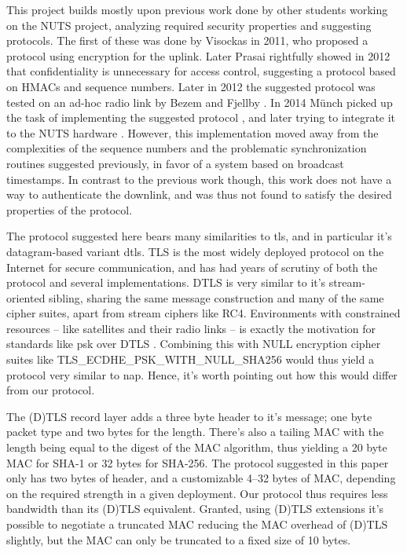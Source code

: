 This project builds mostly upon previous work done by other students working on the NUTS project, analyzing required security properties and suggesting protocols. The first of these was done by Visockas \cite{visockas} in 2011, who proposed a protocol using encryption for the uplink. Later Prasai \cite{prasai} rightfully showed in 2012 that confidentiality is unnecessary for access control, suggesting a protocol based on HMACs and sequence numbers. Later in 2012 the suggested protocol was tested on an ad-hoc radio link by Bezem and Fjellby \cite{bezem-fjellby}. In 2014 Münch picked up the task of implementing the suggested protocol \cite{marius-project}, and later trying to integrate it to the NUTS hardware \cite{marius}. However, this implementation moved away from the complexities of the sequence numbers and the problematic synchronization routines suggested previously, in favor of a system based on broadcast timestamps. In contrast to the previous work though, this work does not have a way to authenticate the downlink, and was thus not found to satisfy the desired properties of the protocol.

The protocol suggested here bears many similarities to \gls{tls}, and in particular it's datagram-based variant \gls{dtls}. TLS is the most widely deployed protocol on the Internet for secure communication, and has had years of scrutiny of both the protocol and several implementations. DTLS is very similar to it's stream-oriented sibling, sharing the same message construction and many of the same cipher suites, apart from stream ciphers like RC4. Environments with constrained resources -- like satellites and their radio links -- is exactly the motivation for standards like \gls{psk} over DTLS \cite{rfc4279}. Combining this with NULL encryption cipher suites like TLS\_ECDHE\_PSK\_WITH\_NULL\_SHA256 \cite{rfc5489} would thus yield a protocol very similar to \gls{nap}. Hence, it's worth pointing out how this would differ from our protocol.

The (D)TLS record layer adds a three byte header to it's message; one byte packet type and two bytes for the length. There's also a tailing MAC with the length being equal to the digest of the MAC algorithm, thus yielding a 20 byte MAC for SHA-1 or 32 bytes for SHA-256. The protocol suggested in this paper only has two bytes of header, and a customizable 4--32 bytes of MAC, depending on the required strength in a given deployment. Our protocol thus requires less bandwidth than its (D)TLS equivalent. Granted, using (D)TLS extensions it's possible to negotiate a truncated MAC \cite{tls-extensions} reducing the MAC overhead of (D)TLS slightly, but the MAC can only be truncated to a fixed size of 10 bytes.

